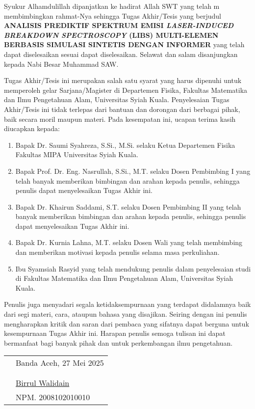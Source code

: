 \preface %

Syukur Alhamdulillah dipanjatkan ke hadirat Allah SWT yang telah m membimbingkan rahmat-Nya sehingga Tugas Akhir/Tesis yang berjudul \textbf{\MakeUppercase{Analisis Prediktif Spektrum Emisi \textit{Laser-Induced Breakdown Spectroscopy} (LIBS) Multi-Elemen Berbasis Simulasi Sintetis dengan Informer}} yang telah dapat diselesaikan sesuai dapat diselesaikan. Selawat dan salam disanjungkan kepada Nabi Besar Muhammad SAW.

Tugas Akhir/Tesis ini merupakan salah satu syarat yang harus dipenuhi untuk memperoleh gelar Sarjana/Magister di Departemen Fisika, Fakultas Matematika dan Ilmu Pengetahuan Alam, Universitas Syiah Kuala. Penyelesaian Tugas Akhir/Tesis ini tidak terlepas dari bantuan dan dorongan dari berbagai pihak, baik secara moril maupun materi. Pada kesempatan ini, ucapan terima kasih diucapkan kepada:

\begin{enumerate}
    \item Bapak Dr. Saumi Syahreza, S.Si., M.Si. selaku Ketua Departemen Fisika Fakultas MIPA Universitas Syiah Kuala.
    \item Bapak Prof. Dr. Eng. Nasrullah, S.Si., M.T. selaku Dosen Pembimbing I yang telah banyak memberikan bimbingan dan arahan kepada penulis, sehingga penulis dapat menyelesaikan Tugas Akhir ini.
    \item Bapak Dr. Khairun Saddami, S.T. selaku Dosen Pembimbing II yang telah banyak memberikan bimbingan dan arahan kepada penulis, sehingga penulis dapat menyelesaikan Tugas Akhir ini.
    \item Bapak Dr. Kurnia Lahna, M.T. selaku Dosen Wali yang telah membimbing dan memberikan motivasi kepada penulis selama masa perkuliahan.
    \item Ibu Syamsiah Rasyid yang telah mendukung penulis dalam penyelesaian studi di Fakultas Matematika dan Ilmu Pengetahuan Alam, Universitas Syiah Kuala.
\end{enumerate}

Penulis juga menyadari segala ketidaksempurnaan yang terdapat didalamnya baik dari segi materi, cara, ataupun bahasa yang disajikan. Seiring dengan ini penulis mengharapkan kritik dan saran dari pembaca yang sifatnya dapat berguna untuk kesempurnaan Tugas Akhir ini. Harapan penulis semoga tulisan ini dapat bermanfaat bagi banyak pihak dan untuk perkembangan ilmu pengetahuan.

\vspace{1cm}


\begin{tabular}{p{7.5cm}l}
	&Banda Aceh, 27 Mei 2025\\
	&\\
	&\\
	&\multirow{1.5}{7.5cm}{\underline{Birrul Walidain}} \\ 
	&NPM. 2008102010010 \\
\end{tabular}
